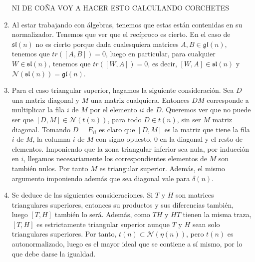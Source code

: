 \documentclass[twoside]{article}
\begin{document}
\begin{solucion}
\begin{enumerate}
NI DE COÑA VOY A HACER ESTO CALCULANDO CORCHETES

\item Al estar trabajando con álgebras, tenemos que estas están contenidas en su normalizador. Tenemos que ver que el recíproco es cierto. En el caso de $\mathfrak{sl}(n)$ no es cierto porque dada cualesquiera matrices $A,B\in\mathfrak{gl}(n)$, tenemos que $tr([A,B])=0$, luego en particular, para cualquier $W\in \mathfrak{sl}(n)$, tenemos que $tr([W,A])=0$, es decir, $[W,A]\in\mathfrak{sl}(n)$ y $\mathcal{N}(\mathfrak{sl}(n))=\mathfrak{gl}(n)$. %

\item 
Para el caso triangular superior, hagamos la siguiente consideración. Sea $D$ una matriz diagonal y $M$ una matriz cualquiera. Entonces $DM$ corresponde a multiplicar la fila $i$ de $M$ por el elemento $ii$ de $D$. Queremos ver que no puede ser que $[D,M] \in \mathcal{N}(t(n))$, para todo $D\in t(n)$, sin ser $M$ matriz diagonal. Tomando $D=E_{ii}$ es claro que $[D,M]$ es la matriz que tiene la fila $i$ de $M$, la columna $i$ de $M$ con signo opuesto, $0$ en la diagonal y el resto de elementos. Imponiendo que la zona triangular inferior sea nula, por inducción en $i$, llegamos  necesariamente los correspondientes elementos de $M$ son también nulos. Por tanto $M$ es triangular superior. Además, el mismo argumento imponiendo además que sea diagonal vale para $\delta(n)$.

\item Se deduce de las siguientes consideraciones. Si $T$ y $H$ son matrices triangulares superiores, entonces su productos y sus diferencias también, luego $[T,H]$ también lo será. Además, como $TH$ y $HT$ tienen la misma traza, $[T,H]$ es estrictamente triangular superior aunque $T$ y $H$ sean solo triangulares superiores. Por tanto, $t(n) \subset \mathcal{N}(\eta(n))$, pero $t(n)$ es autonormalizado, luego es el mayor ideal que se contiene a sí mismo, por lo que debe darse la igualdad. 
\end{enumerate}
\end{solucion}
\end{document}
